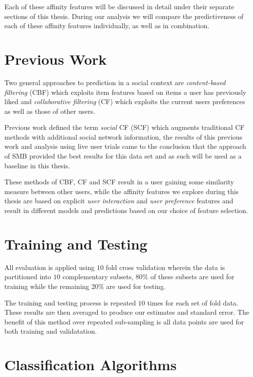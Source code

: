 Each of these affinity features will be discussed in detail under their separate sections of this thesis.
During our analysis we will compare the predictiveness of each of these affinity features individually, as well as in combination.

\section{Previous Work}
\label{sec:pw}

Two general approaches to prediction in a social context are \emph{content-based filtering} (CBF) \cite{newsweeder} which exploits 
item features based on items a user has previously liked and  \emph{collaborative filtering} (CF) 
\cite{collab_filtering} which exploits the current users preferences as well as those of other users. 

Previous work defined the term \emph{social} CF (SCF) \cite{joseph} which augments traditional CF methods with additional social 
network information, the results of this previous work and analysis using live user trials came to the conclusion that the approach of SMB
provided the best results for this data set and as such will be used as a baseline in this thesis.

These methods of CBF, CF and SCF result in a user gaining some similarity measure between other users, while the affinity features we 
explore during this thesis are based on explicit \emph{user interaction} and \emph{user preference} features and result in different 
models and predictions based on our choice of feature selection.

\section{Training and Testing}
\label{sec:tt}

All evaluation is applied using $10$ fold cross validation wherein the data is partitioned into $10$ complementary subsets, $80\%$ of 
these subsets are used for training while the remaining $20\%$ are used for testing.

The training and testing process is repeated $10$ times for each set of fold data. These results are then averaged to produce our 
estimates and standard error. The benefit of this method over repeated sub-sampling is all data points are used for both training 
and validatation.

\section{Classification Algorithms}
\label{sec:meth}

